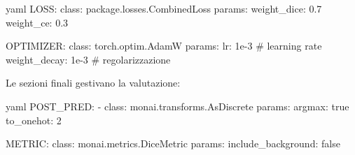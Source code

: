 \begin{code}{yaml}
LOSS:
  class: package.losses.CombinedLoss
  params:
    weight_dice: 0.7
    weight_ce: 0.3

OPTIMIZER:
  class: torch.optim.AdamW
  params:
    lr: 1e-3               # learning rate
    weight_decay: 1e-3      # regolarizzazione
\end{code}


Le sezioni finali gestivano la valutazione:

\begin{code}{yaml}
POST_PRED:
  - class: monai.transforms.AsDiscrete
    params:
      argmax: true
      to_onehot: 2

METRIC:
  class: monai.metrics.DiceMetric
  params:
    include_background: false
\end{code}


